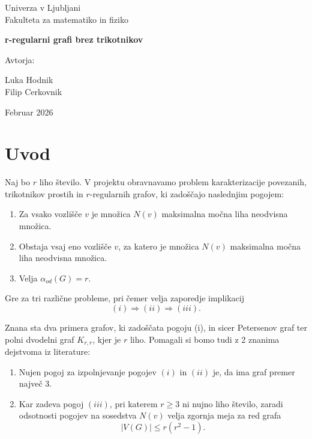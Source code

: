 \documentclass[a4paper,12pt]{article}
\begin{document}
\begin{titlepage}
    \centering

    {\Large Univerza v Ljubljani\\
    Fakulteta za matematiko in fiziko\par}
    
    \vspace{3cm}
    
    {\Huge \textbf{r-regularni grafi brez trikotnikov}\par}
    
    \vspace{3cm}
    
    {\large Avtorja:\par}
    \vspace{0.2cm}
    {\large Luka Hodnik\\
    Filip Cerkovnik\par}
    
    \vfill
    
    {\large Februar 2026\par}
\end{titlepage}

\tableofcontents
\newpage

\section{Uvod}
Naj bo $r$ liho število. V projektu obravnavamo problem karakterizacije
povezanih, trikotnikov prostih in $r$-regularnih grafov, ki zadoščajo
naslednjim pogojem:
\begin{enumerate}
    \item Za vsako vozlišče $v$ je množica $N(v)$ maksimalna močna liha
    neodvisna množica.
    \item Obstaja vsaj eno vozlišče $v$, za katero je množica $N(v)$
    maksimalna močna liha neodvisna množica.
    \item Velja $\alpha_{od}(G) = r$.
\end{enumerate}

Gre za tri različne probleme, pri čemer velja zaporedje implikacij
\[
(i)\Rightarrow(ii)\Rightarrow(iii).
\]

Znana sta dva primera grafov, ki zadoščata pogoju (i), in sicer
Petersenov graf ter polni dvodelni graf $K_{r,r}$, kjer je $r$ liho.
Pomagali si bomo tudi z 2 znanima dejstvoma iz literature:
\begin{enumerate}
    \item Nujen pogoj za izpolnjevanje pogojev $(i)$ in $(ii)$ je, da ima graf
    premer največ $3$.
    \item Kar zadeva pogoj $(iii)$, pri katerem $r \ge 3$ ni nujno liho število,
    zaradi odsotnosti pogojev na sosedstva $N(v)$ velja zgornja meja
    za red grafa
    \[
    |V(G)| \le r(r^2 - 1).
    \]
\end{enumerate}
\end{document}
